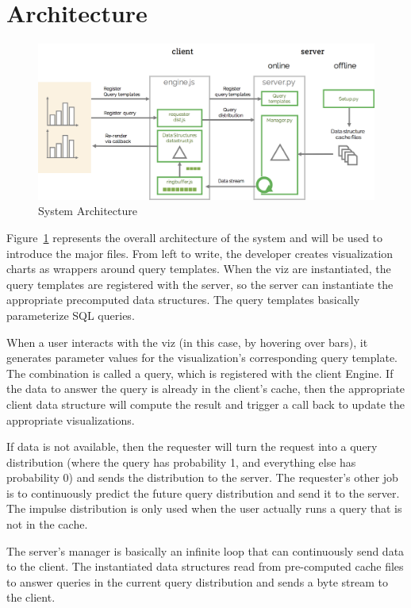 \section{Architecture}\label{s:arch}


\begin{figure}[ht]
	\centering
	\includegraphics[width=1\columnwidth]{figures/arch}
 	\caption{System Architecture}
  \label{fig:arch}
\end{figure}

Figure~\ref{fig:arch} represents the overall architecture of the system and will be used to introduce the major files.
From left to write, the developer creates visualization charts as wrappers around query templates. When the viz are instantiated, the query templates are registered with the server, so the server can instantiate the appropriate precomputed data structures. The query templates basically parameterize SQL queries.

When a user interacts with the viz (in this case, by hovering over bars), it generates parameter values for the visualization's corresponding query template. The combination is called a query, which is registered with the client Engine. If the data to answer the query is already in the client's cache, then the appropriate client data structure will compute the result and trigger a call back to update the appropriate visualizations.

If data is not available, then the requester will turn the request into a query distribution (where the query has probability 1, and everything else has probability 0) and sends the distribution to the server. The requester's other job is to continuously predict the future query distribution and send it to the server. The impulse distribution is only used when the user actually runs a query that is not in the cache.

The server's manager is basically an infinite loop that can continuously send data to the client. The instantiated data structures read from pre-computed cache files to answer queries in the current query distribution and sends a byte stream to the client.

